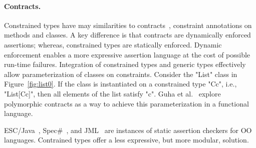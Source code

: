 \paragraph{Contracts.}

Constrained types have may similarities to
contracts~\cite{Parnas72,eiffel,Findler02},
constraint annotations on methods and classes.
A key difference is that contracts are dynamically enforced
assertions; whereas, constrained types are statically enforced.
Dynamic enforcement enables a more expressive assertion language
at the cost of possible run-time failures.
Integration of constrained types and generic types
effectively allow parameterization of classes on constraints.
Consider the \xcd"List" class in Figure~\ref{fig:list0}.
If the class is instantiated on a constrained type \xcd"C{c}",
i.e., \xcd"List[C{c}]",
then all elements of the list satisfy \xcd"c".
Guha et al.~\cite{GMFK07} 
explore polymorphic contracts as a way to achieve this
parameterization in a functional language.

ESC/Java~\cite{escjava}, Spec\#~\cite{specsharp}, and
JML~\cite{jml-overview,leavens00jml} are instances of
static assertion checkers for OO languages.  Contrained types
offer a less expressive, but more modular, solution.


